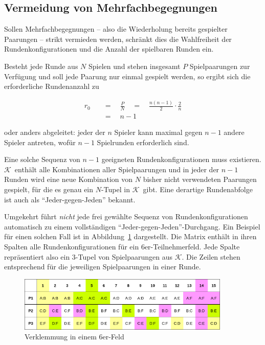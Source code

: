 \documentclass[DIV=15, 10pt]{scrartcl}
\newcommand{\KSet}{$\mathcal{K}$}
\begin{document}
\subsection{Vermeidung von Mehrfachbegegnungen}
\label{laMehrfach}

Sollen Mehrfachbegegnungen -- also die Wiederholung bereits gespielter Paarungen -- strikt vermieden werden, schränkt dies die Wahlfreiheit der Rundenkonfigurationen und die Anzahl der spielbaren Runden ein.

Besteht jede Runde aus $N$ Spielen und stehen insgesamt $P$ Spielpaarungen zur Verfügung und soll jede Paarung nur einmal gespielt werden, so ergibt sich die erforderliche Rundenanzahl zu

\begin{align}
r_0 \quad &= \quad \frac{P}{N} \quad = \quad \frac{n(n-1)}{2} \cdot \frac{2}{n} \nonumber \\[3mm]
&= \quad n - 1
\end{align}

oder anders abgeleitet: jeder der $n$ Spieler kann maximal gegen $n-1$ andere Spieler antreten, wofür $n-1$ Spielrunden erforderlich sind.

Eine solche Sequenz von $n-1$ geeigneten Rundenkonfigurationen muss existieren. \KSet\ enthält alle Kombinationen aller Spielpaarungen und in jeder der $n-1$ Runden wird eine neue Kombination von $N$ bisher nicht verwendeten Paarungen gespielt, für die es genau ein $N$-Tupel in \KSet\ gibt. Eine derartige Rundenabfolge ist auch als "`Jeder-gegen-Jeden"' bekannt.

Umgekehrt führt \emph{nicht} jede frei gewählte Sequenz von Rundenkonfigurationen automatisch zu einem vollständigen "`Jeder-gegen-Jeden"'-Durchgang. Ein Beispiel für einen solchen Fall ist in Abbildung~\ref{figDeadlock} dargestellt. Die Matrix enthält in ihren Spalten alle Rundenkonfigurationen für ein 6er-Teilnehmerfeld. Jede Spalte repräsentiert also ein 3-Tupel von Spielpaarungen aus \KSet. Die Zeilen stehen entsprechend für die jeweiligen Spielpaarungen in einer Runde.

\begin{figure}[hbtp]
\centering
\includegraphics[width=0.9\textwidth]{Verklemmung6_6er.png}
\caption{Verklemmung in einem 6er-Feld}
\label{figDeadlock}
\end{figure}
\end{document}
